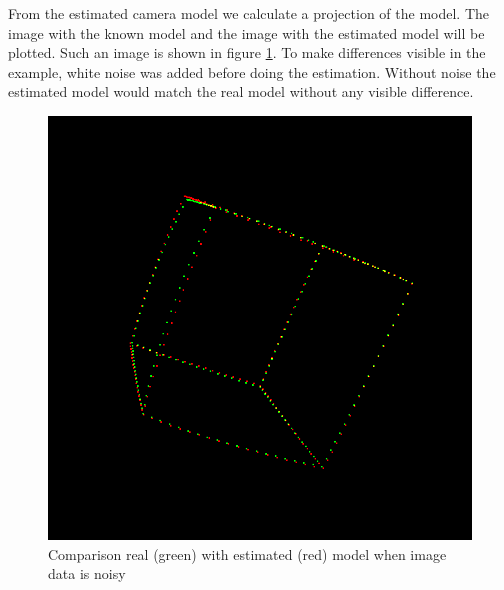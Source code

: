 \documentclass[11pt,a4paper,titlepage,oneside]{report}
\begin{document}
From the estimated camera model we calculate a projection of the model. The image with the known model and the image with the estimated model will be plotted. Such an image is shown in figure \ref{fig:diff_img}. To make differences visible in the example, white noise was added before doing the estimation. Without noise the estimated model would match the real model without any visible difference.
\begin{figure}[H]
  \begin{center}
		\includegraphics[width=1.0\textwidth]{img/diff_img.png}
  \end{center}
	\caption{Comparison real (green) with estimated (red) model when image data is noisy}\label{fig:diff_img}
\end{figure}
\end{document}
